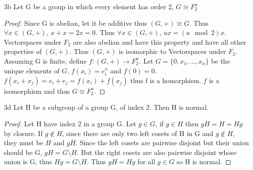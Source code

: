 \documentclass{article}
\begin{document}
\begin{claim}{3b}
    Let G be a group in which every element has order 2, $G \cong F_2^n$
\end{claim}
\begin{proof}
    Since G is abelian, let it be additive thus $(G, +) \cong G$. Thus $\forall x \in (G, +)$, $x + x = 2x = 0$. Thus $\forall x \in (G, +)$, $ax = (a \mod 2)x$. Vectorspaces under $F_2$ are also abelian and have this property and have all other properties of $(G, +)$. Thus $(G, +)$ is isomorphic to Vectorspaces under $F_2$. Assuming G is finite, define $f: (G, +) \to F_2^n$. Let $G = \{0, x_1, \ldots, x_n\}$ be the unique elements of $G$. $f(x_i) = e^n_i$ and $f(0) = 0$. $f(x_i + x_j) = e_i + e_j = f(x_i) + f(x_j)$ thus f is a homorphism. $f$ is a isomorphism and thus $G \cong F_2^n$.
\end{proof}

\begin{claim}{3d}
    Let H be a subgroup of a group G, of index 2. Then H is normal.
\end{claim}
\begin{proof}
    Let H have index 2 in a group G. Let $g \in G$, if $g \in H$ then $gH = H = Hg$ by closure. If $g \not \in H$, since there are only two left cosets of H in G and $g \not \in H$, they must be $H$ and $gH$. Since the left cosets are pairwise disjoint but their union should be G, $gH = G \setminus H$. But the right cosets are also pairwise disjoint whose union is G, thus $Hg = G \setminus H$. Thus $gH = Hg$ for all $g \in G$ so H is normal.
\end{proof}
\end{document}
